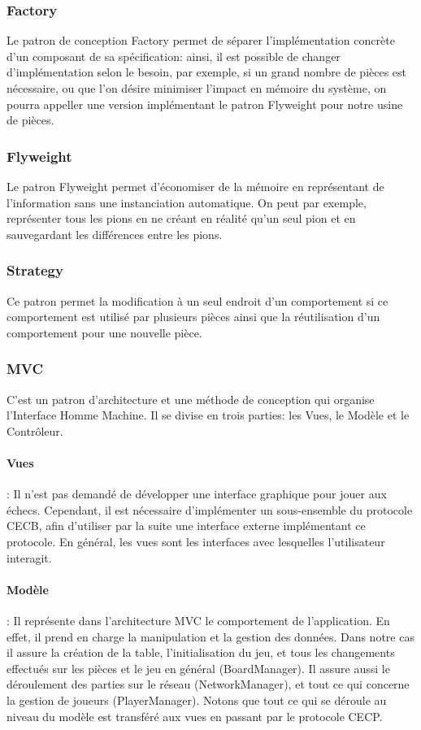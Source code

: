 \documentclass[11pt]{article}
\begin{document}
\subsubsection{Factory}
\label{sec-3-3-2}
Le patron de conception Factory permet de séparer l'implémentation concrète d'un composant de sa spécification: ainsi, il est possible de changer d'implémentation selon le besoin, par exemple, si un grand nombre de pièces est nécessaire, ou que l'on désire minimiser l'impact en mémoire du système, on pourra appeller une version implémentant le patron Flyweight pour notre usine de pièces.
\subsubsection{Flyweight}
\label{sec-3-3-3}
Le patron Flyweight permet d'économiser de la mémoire en représentant de l'information sans une instanciation automatique. On peut par exemple, représenter tous les pions en ne créant en réalité qu'un seul pion et en sauvegardant les différences entre les pions.
\subsubsection{Strategy}
\label{sec-3-3-4}
Ce patron permet la modification à un seul endroit d'un comportement si ce comportement est utilisé par plusieurs pièces ainsi que la réutilisation d'un comportement pour une nouvelle pièce.
\subsubsection{MVC}
\label{sec-3-3-5}
C'est un patron d'architecture et une méthode de conception qui organise l'Interface Homme Machine. Il se divise en trois parties: les Vues, le Modèle et le Contrôleur.
\paragraph{Vues} : Il n'est pas demandé de développer une interface graphique pour jouer aux échecs. Cependant, il est nécessaire d'implémenter un sous-ensemble du protocole CECB, afin d'utiliser par la suite une interface externe implémentant ce protocole.
En général, les vues sont les interfaces avec lesquelles l'utilisateur interagit.
\paragraph{Modèle} : Il représente dans l'architecture MVC le comportement de l'application. En effet, il prend en charge la manipulation et la gestion des données. Dans notre cas il assure la création de la table, l'initialisation du jeu, et tous les changements effectués sur les pièces et le jeu en général (BoardManager). Il assure aussi le déroulement des parties sur le réseau (NetworkManager), et tout ce qui concerne la gestion de joueurs (PlayerManager). Notons que tout ce qui se déroule au niveau du modèle est transféré aux vues en passant par le protocole CECP.
\end{document}
